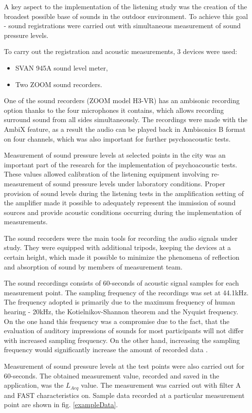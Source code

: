 \documentclass[a4paper,10pt]{article}
\begin{document}
\begin{multicols}{2}

  A key aspect to the implementation of the listening study was the creation of
  the broadest possible base of sounds in the outdoor environment. To achieve
  this goal - sound registrations were carried out with simultaneous measurement
  of sound pressure levels.

  To carry out the registration and acoustic measurements, 3 devices were used:
  \begin{itemize}
    \item SVAN 945A sound level meter,
    \item Two ZOOM sound recorders.
  \end{itemize}

  One of the sound recorders (ZOOM model H3-VR) has an ambisonic recording
  option thanks to the four microphones it contains, which allows recording
  surround sound from all sides simultaneously. The recordings were made with
  the AmbiX feature, as a result the audio can be played back in Ambisonics B
  format on four channels, which was also important for further psychoacoustic
  tests.

  Measurement of sound pressure levels at selected points in the city was an
  important part of the research for the implementation of psychoacoustic tests.
  These values allowed calibration of the listening equipment involving
  re-measurement of sound pressure levels under laboratory conditions. Proper
  provision of sound levels during the listening tests in the amplification
  setting of the amplifier made it possible to adequately represent the
  immission of sound sources and provide acoustic conditions occurring during
  the implementation of measurements.

  The sound recorders were the main tools for recording the audio signals under
  study. They were equipped with additional tripods, keeping the devices at a
  certain height, which made it possible to minimize the phenomena of reflection
  and absorption of sound by members of measurement team.

  The sound recordings consists of 60-seconds of acoustic signal samples for
  each measurement point. The sampling frequency of the recordings was set at
  44.1kHz. The frequency adopted is primarily due to the maximum frequency of
  human hearing - 20kHz, the Kotielnikov-Shannon theorem and the Nyquist
  frequency. On the one hand this frequency was a compromise due to the fact,
  that the evaluation of auditory impressions of sounds for most participants
  will not differ with increased sampling frequency. On the other hand,
  increasing the sampling frequency would significantly increase the amount of
  recorded data \cite{ISO:266, ISO:9613-1}.

  Measurement of sound pressure levels at the test points were also carried out
  for 60-seconds. The obtained measurement value, recorded and saved in the
  application, was the $L_{Aeq}$ value. The measurement was carried out with
  filter A and FAST characteristics on. Sample data recorded at a particular
  measurement point are shown in fig. \ref{exampleData}.
\end{multicols}
\end{document}
